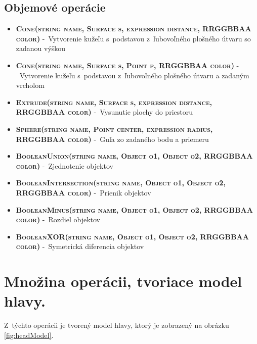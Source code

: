 \section*{Objemové operácie}

\begin{itemize}
\item \textsc{\textbf{Cone(string name, Surface s, expression distance, RRGGBBAA color)}} \newline-~Vytvorenie kužeľu s~podstavou z~ľubovoľného plošného útvaru so zadanou výškou%

\item \textsc{\textbf{Cone(string name, Surface s, Point p, RRGGBBAA color)}} -~Vytvorenie kužeľu s~podstavou z~ľubovoľného plošného útvaru a zadaným vrcholom%

\item \textsc{\textbf{Extrude(string name, Surface s, expression distance, RRGGBBAA color)}}  -~Vysunutie plochy do priestoru%


\item \textsc{\textbf{Sphere(string name, Point center, expression radius, RRGGBBAA color)}} -~Guľa zo zadaného bodu a priemeru

\item \textsc{\textbf{BooleanUnion(string name, Object o1, Object o2, RRGGBBAA color)}} \newline-~Zjednotenie objektov
\item \textsc{\textbf{BooleanIntersection(string name, Object o1, Object o2, RRGGBBAA color)}} -~Prienik objektov%
\item \textsc{\textbf{BooleanMinus(string name, Object o1, Object o2, RRGGBBAA color)}} \newline-~Rozdiel objektov%
\item \textsc{\textbf{BooleanXOR(string name, Object o1, Object o2, RRGGBBAA color)}} \newline-~Symetrická diferencia objektov%
\end{itemize}


\chapter{Množina operácii, tvoriace model hlavy.}
\label{mnozinaoperacii}
Z~týchto operácii je tvorený model hlavy, ktorý je zobrazený na obrázku \ref{fig:headModel}.


